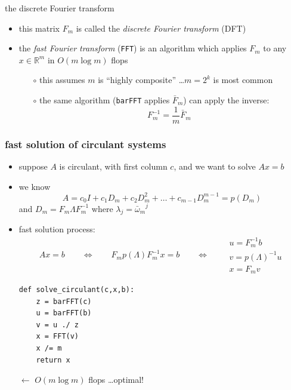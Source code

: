 \documentclass[10pt,
               svgnames,
               hyperref={colorlinks,citecolor=DeepPink4,linkcolor=FireBrick,urlcolor=Maroon},
               usepdftitle=false]{beamer}
\newcommand{\RR}{\mathbb{R}}
\begin{document}
\begin{frame}{the discrete Fourier transform}

\begin{itemize}
\item this matrix $F_m$ is called the \emph{discrete Fourier transform} (DFT)
\item the \emph{fast Fourier transform} (\texttt{FFT}) is an algorithm which applies $F_m$ to any $x\in\RR^m$ in $O(m\log m)$ flops
   \begin{itemize}
   \item[$\circ$] this assumes $m$ is ``highly composite'' \dots $m=2^k$ is most common
   \item[$\circ$] the same algorithm (\texttt{barFFT} applies $\bar F_m$) can apply the inverse:
       $$F_m^{-1} = \frac{1}{m} \bar F_m$$
   \end{itemize}
\end{itemize}
\end{frame}


\begin{frame}[fragile]
\frametitle{fast solution of circulant systems}

\begin{itemize}
\item suppose $A$ is circulant, with first column $c$, and we want to solve $Ax=b$
\item we know
  $$A = c_0 I + c_1 D_m + c_2 D_m^2 + \dots + c_{m-1} D_m^{m-1} = p(D_m)$$
and $D_m = F_m \Lambda F_m^{-1}$ where $\lambda_j = {\bar\omega_m}^j$
\item fast solution process:
    $$Ax = b \qquad \iff \qquad F_m p(\Lambda) F_m^{-1} x = b \qquad \iff \qquad \begin{matrix} u = F_m^{-1} b \\ v = p(\Lambda)^{-1} u \\ x = F_m v \end{matrix}$$ 

\begin{verbatim}
def solve_circulant(c,x,b):
    z = barFFT(c)
    u = barFFT(b)
    v = u ./ z
    x = FFT(v)
    x /= m
    return x
\end{verbatim}

\vspace{-20mm}
\hfill $\gets$ \quad $O(m\log m)$ flops \dots optimal!

\vspace{15mm}
\end{itemize}
\end{frame}
\end{document}

